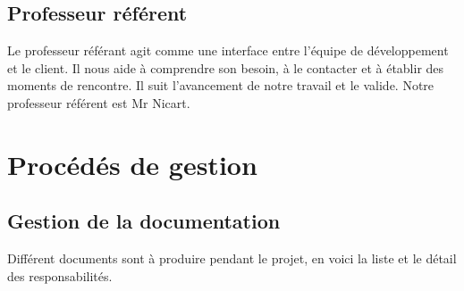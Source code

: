 \documentclass{../res/univ-projet}
\begin{document}
  \subsection{Professeur référent}
    Le professeur référant agit comme une interface entre l'équipe de développement et le client. Il nous aide à comprendre son besoin, à le contacter et à établir des moments de rencontre. Il suit l'avancement de notre travail et le valide. Notre professeur référent est Mr Nicart.

  \newpage
\section{Procédés de gestion}
  \subsection{Gestion de la documentation}
    Différent documents sont à produire pendant le projet, en voici la liste et le détail des responsabilités.\\
\end{document}
